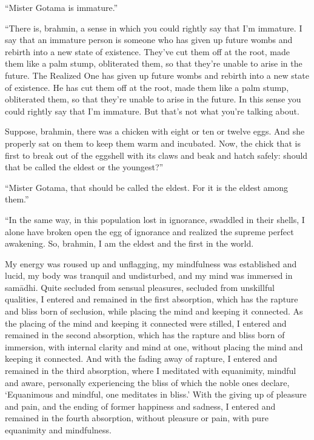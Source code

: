 \documentclass[12pt,openany]{book}%
\begin{document}
“Mister Gotama is immature.” 

“There is, brahmin, a sense in which you could rightly say that I’m immature. I say that an immature person is someone who has given up future wombs and rebirth into a new state of existence. They’ve cut them off at the root, made them like a palm stump, obliterated them, so that they’re unable to arise in the future. The Realized One has given up future wombs and rebirth into a new state of existence. He has cut them off at the root, made them like a palm stump, obliterated them, so that they’re unable to arise in the future. In this sense you could rightly say that I’m immature. But that’s not what you’re talking about. 

Suppose, brahmin, there was a chicken with eight or ten or twelve eggs. And she properly sat on them to keep them warm and incubated. Now, the chick that is first to break out of the eggshell with its claws and beak and hatch safely: should that be called the eldest or the youngest?” 

“Mister Gotama, that should be called the eldest. For it is the eldest among them.” 

“In the same way, in this population lost in ignorance, swaddled in their shells, I alone have broken open the egg of ignorance and realized the supreme perfect awakening. So, brahmin, I am the eldest and the first in the world. 

My energy was roused up and unflagging, my mindfulness was established and lucid, my body was tranquil and undisturbed, and my mind was immersed in \textsanskrit{samādhi}. Quite secluded from sensual pleasures, secluded from unskillful qualities, I entered and remained in the first absorption, which has the rapture and bliss born of seclusion, while placing the mind and keeping it connected. As the placing of the mind and keeping it connected were stilled, I entered and remained in the second absorption, which has the rapture and bliss born of immersion, with internal clarity and mind at one, without placing the mind and keeping it connected. And with the fading away of rapture, I entered and remained in the third absorption, where I meditated with equanimity, mindful and aware, personally experiencing the bliss of which the noble ones declare, ‘Equanimous and mindful, one meditates in bliss.’ With the giving up of pleasure and pain, and the ending of former happiness and sadness, I entered and remained in the fourth absorption, without pleasure or pain, with pure equanimity and mindfulness. 
\end{document}
